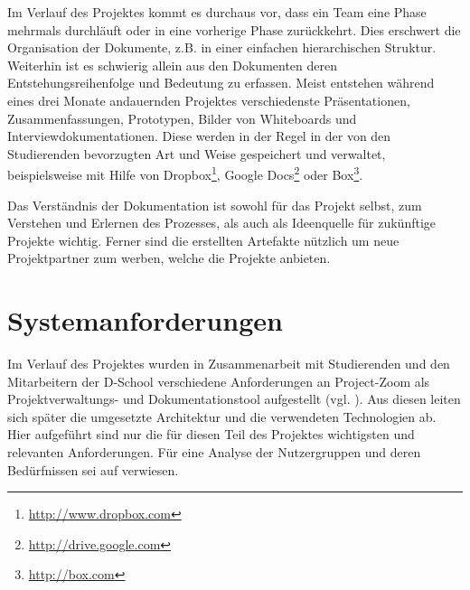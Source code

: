Im Verlauf des Projektes kommt es durchaus vor, dass ein Team eine Phase mehrmals durchläuft oder in eine vorherige Phase zurückkehrt. Dies erschwert die Organisation der Dokumente, z.B. in einer einfachen hierarchischen Struktur. Weiterhin ist es schwierig allein aus den Dokumenten deren Entstehungsreihenfolge und Bedeutung zu erfassen. Meist entstehen während eines drei Monate andauernden Projektes verschiedenste Präsentationen, Zusammenfassungen, Prototypen, Bilder von Whiteboards und Interviewdokumentationen. Diese werden in der Regel in der von den Studierenden bevorzugten Art und Weise gespeichert und verwaltet, beispielsweise mit Hilfe von Dropbox\footnote{\url{http://www.dropbox.com}}, Google Docs\footnote{\url{http://drive.google.com}} oder \gls{Box}\footnote{\url{http://box.com}}.

Das Verständnis der Dokumentation ist sowohl für das Projekt selbst, zum Verstehen und Erlernen des Prozesses, als auch als Ideenquelle für zukünftige Projekte wichtig. Ferner sind die erstellten Artefakte nützlich um neue Projektpartner zum werben, welche die Projekte anbieten. 

\section{Systemanforderungen}
Im Verlauf des Projektes wurden in Zusammenarbeit mit Studierenden und den Mitarbeitern der D-School verschiedene Anforderungen an Project-Zoom als Projektverwaltungs- und Dokumentationstool aufgestellt (vgl. \cite{requirements}).  Aus diesen leiten sich später die umgesetzte Architektur und die verwendeten Technologien ab. Hier aufgeführt sind nur die für diesen Teil des Projektes wichtigsten und relevanten Anforderungen. Für eine Analyse der Nutzergruppen und deren Bedürfnissen sei auf \cite{requirements}  verwiesen.

